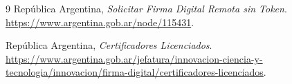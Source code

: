 \documentclass[11pt,a4paper]{article}
\begin{document}
\begin{thebibliography}{9}
República Argentina, \emph{Solicitar Firma Digital Remota sin Token}.
\url{https://www.argentina.gob.ar/node/115431}.

República Argentina, \emph{Certificadores Licenciados}.
\url{https://www.argentina.gob.ar/jefatura/innovacion-ciencia-y-tecnologia/innovacion/firma-digital/certificadores-licenciados}.
\end{thebibliography}
\end{document}
